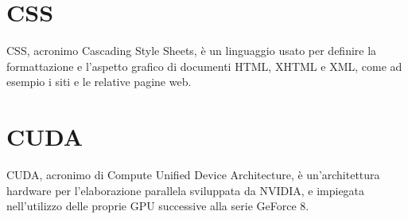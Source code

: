 \section{CSS}\label{sec:Cascading Style Sheets}
CSS, acronimo Cascading Style Sheets, è un linguaggio usato per definire la formattazione e l'aspetto grafico di documenti HTML, XHTML e XML, come ad esempio i siti e le relative pagine web.

\section{CUDA}\label{sec:Cascading Style Sheets}
CUDA, acronimo di Compute Unified Device Architecture, è un'architettura hardware per l'elaborazione parallela sviluppata da NVIDIA, e impiegata nell'utilizzo delle proprie GPU successive alla serie GeForce 8.